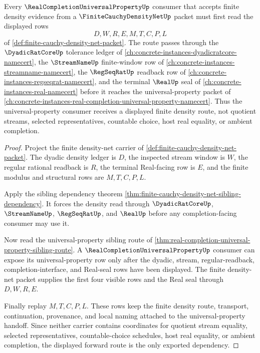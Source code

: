 \begin{theorem}
\label{thm:finite-cauchy-density-net-real-completion-universal-property-forward-route}
Every $\RealCompletionUniversalPropertyUp$ consumer that accepts finite density evidence from a $\FiniteCauchyDensityNetUp$ packet must first read the displayed rows
$$
D,W,R,E,M,T,C,P,L
$$
of \autoref{def:finite-cauchy-density-net-packet}. The route passes through the $\DyadicRatCoreUp$ tolerance ledger of \autoref{ch:concrete-instances-dyadicratcore-namecert}, the $\StreamNameUp$ finite-window row of \autoref{ch:concrete-instances-streamname-namecert}, the $\RegSeqRatUp$ readback row of \autoref{ch:concrete-instances-regseqrat-namecert}, and the terminal $\RealUp$ seal of \autoref{ch:concrete-instances-real-namecert} before it reaches the universal-property packet of \autoref{ch:concrete-instances-real-completion-universal-property-namecert}. Thus the universal-property consumer receives a displayed finite density route, not quotient streams, selected representatives, countable choice, host real equality, or ambient completion.
\end{theorem}
\begin{proof}
Project the finite density-net carrier of \autoref{def:finite-cauchy-density-net-packet}. The dyadic density ledger is $D$, the inspected stream window is $W$, the regular rational readback is $R$, the terminal Real-facing row is $E$, and the finite modulus and structural rows are $M,T,C,P,L$.

Apply the sibling dependency theorem \autoref{thm:finite-cauchy-density-net-sibling-dependency}. It forces the density read through $\DyadicRatCoreUp$, $\StreamNameUp$, $\RegSeqRatUp$, and $\RealUp$ before any completion-facing consumer may use it.

Now read the universal-property sibling route of \autoref{thm:real-completion-universal-property-sibling-route}. A $\RealCompletionUniversalPropertyUp$ consumer can expose its universal-property row only after the dyadic, stream, regular-readback, completion-interface, and Real-seal rows have been displayed. The finite density-net packet supplies the first four visible rows and the Real seal through $D,W,R,E$.

Finally replay $M,T,C,P,L$. These rows keep the finite density route, transport, continuation, provenance, and local naming attached to the universal-property handoff. Since neither carrier contains coordinates for quotient stream equality, selected representatives, countable-choice schedules, host real equality, or ambient completion, the displayed forward route is the only exported dependency.
\end{proof}
